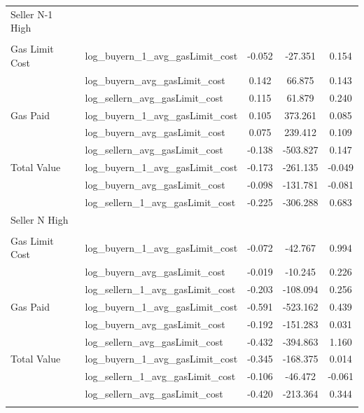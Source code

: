 \begin{table}
\begin{tabular}{llccc}
Seller N-1 High &  &  &  & \\
 &  &  &  & \\
Gas Limit Cost & log\_buyern\_1\_avg\_gasLimit\_cost & -0.052 & -27.351 & 0.154\\
 & log\_buyern\_avg\_gasLimit\_cost & 0.142 & 66.875 & 0.143\\
 & log\_sellern\_avg\_gasLimit\_cost & 0.115 & 61.879 & 0.240\\
Gas Paid & log\_buyern\_1\_avg\_gasLimit\_cost & 0.105 & 373.261 & 0.085\\
 & log\_buyern\_avg\_gasLimit\_cost & 0.075 & 239.412 & 0.109\\
 & log\_sellern\_avg\_gasLimit\_cost & -0.138 & -503.827 & 0.147\\
Total Value & log\_buyern\_1\_avg\_gasLimit\_cost & -0.173 & -261.135 & -0.049\\
 & log\_buyern\_avg\_gasLimit\_cost & -0.098 & -131.781 & -0.081\\
 & log\_sellern\_1\_avg\_gasLimit\_cost & -0.225 & -306.288 & 0.683\\
Seller N High &  &  &  & \\
 &  &  &  & \\
Gas Limit Cost & log\_buyern\_1\_avg\_gasLimit\_cost & -0.072 & -42.767 & 0.994\\
 & log\_buyern\_avg\_gasLimit\_cost & -0.019 & -10.245 & 0.226\\
 & log\_sellern\_1\_avg\_gasLimit\_cost & -0.203 & -108.094 & 0.256\\
Gas Paid & log\_buyern\_1\_avg\_gasLimit\_cost & -0.591 & -523.162 & 0.439\\
 & log\_buyern\_avg\_gasLimit\_cost & -0.192 & -151.283 & 0.031\\
 & log\_sellern\_avg\_gasLimit\_cost & -0.432 & -394.863 & 1.160\\
Total Value & log\_buyern\_1\_avg\_gasLimit\_cost & -0.345 & -168.375 & 0.014\\
 & log\_sellern\_1\_avg\_gasLimit\_cost & -0.106 & -46.472 & -0.061\\
 & log\_sellern\_avg\_gasLimit\_cost & -0.420 & -213.364 & 0.344\\
\bottorule
\end{tabular}
\end{table}
